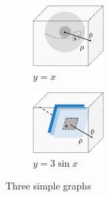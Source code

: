 \begin{figure}[ht]
     \centering
     \begin{subfigure}[h]{0.3\textwidth}
         \centering
         \includegraphics[width=0.3\textwidth]{Chapters/Figures/Ch2_UltrasoundFundamentals/sphere.pdf}
         \caption{$y=x$}
         \label{fig:ch2_spherical_wave}
     \end{subfigure}
     \hfill
     \begin{subfigure}[h]{0.3\textwidth}
         \centering
         \includegraphics[width=0.3\textwidth]{Chapters/Figures/Ch2_UltrasoundFundamentals/planar.pdf}
         \caption{$y=3\sin x$}
         \label{fig:ch2_planar_wave}
     \end{subfigure}
        \caption{Three simple graphs}
        \label{fig:ch2_wavefront}
\end{figure}

